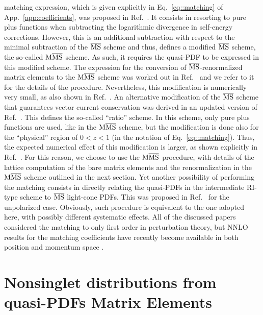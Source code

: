 matching expression, which is given explicitly in Eq.~\eqref{eq::matching} of
App.~\ref{app:coefficients}, was proposed in Ref.~\cite{Alexandrou:2018pbm}. It
consists in resorting to pure plus functions when subtracting the logarithmic
divergence in self-energy corrections. However, this is an additional
subtraction with respect to the minimal subtraction of the $\overline{\mathrm{MS}}$ scheme and
thus, defines a modified $\overline{\mathrm{MS}}$ scheme, the so-called ${\rm M}\overline{\mathrm{MS}}$ scheme. As such,
it requires the quasi-PDF to be expressed in this modified scheme. The
expression for the conversion of $\overline{\mathrm{MS}}$-renormalized matrix elements to the
${\rm M}\overline{\mathrm{MS}}$ scheme was worked out in Ref.~\cite{Alexandrou:2019lfo} and we refer to
it for the details of the procedure. Nevertheless, this modification is
numerically very small, as also shown in Ref.~\cite{Alexandrou:2019lfo}. An
alternative modification of the $\overline{\mathrm{MS}}$ scheme that guarantees vector current
conservation was derived in an updated version of Ref.~\cite{Izubuchi:2018srq}.
This defines the so-called ``ratio'' scheme. In this scheme, only pure plus
functions are used, like in the ${\rm M}\overline{\mathrm{MS}}$ scheme, but the modification is done
also for the ``physical'' region of $0<z<1$ (in the notation of
Eq.~\eqref{eq::matching}). Thus, the expected numerical effect of this
modification is larger, as shown explicitly in Ref.~\cite{Alexandrou:2019lfo}.
For this reason, we choose to use the ${\rm M}\overline{\mathrm{MS}}$ procedure, with details of the
lattice computation of the bare matrix elements and the renormalization in the
${\rm M}\overline{\mathrm{MS}}$ scheme outlined in the next section. Yet another possibility of
performing the matching consists in directly relating the quasi-PDFs in the
intermediate RI-type scheme to $\overline{\mathrm{MS}}$ light-cone PDFs. This was proposed in
Ref.~\cite{Stewart:2017tvs} for the unpolarized case. Obviously, such
procedure is equivalent to the one adopted here, with possibly different
systematic effects. All of the discussed papers considered the matching to only
first order in perturbation theory, but NNLO results for the matching coefficients have recently become available
in both position and momentum space \cite{Li:2020xml, Chen:2020ody, Braun:2020ymy, Chen:2020arf, Chen:2020iqi}.


\section{Nonsinglet distributions from quasi-PDFs Matrix Elements}
\label{sec:PDFstoqPDFs}

